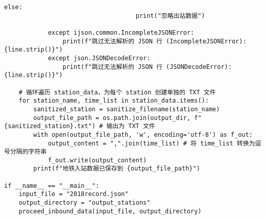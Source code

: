 \begin{lstlisting}[caption={处理和清洗入站数据}]
                                else:
                                    print("忽略出站数据")

            except ijson.common.IncompleteJSONError:
                print(f"跳过无法解析的 JSON 行 (IncompleteJSONError): {line.strip()}")
            except json.JSONDecodeError:
                print(f"跳过无法解析的 JSON 行 (JSONDecodeError): {line.strip()}")

    # 循环遍历 station_data，为每个 station 创建单独的 TXT 文件
    for station_name, time_list in station_data.items():
        sanitized_station = sanitize_filename(station_name)
        output_file_path = os.path.join(output_dir, f"{sanitized_station}.txt") # 输出为 TXT 文件
        with open(output_file_path, 'w', encoding='utf-8') as f_out:
            output_content = ",".join(time_list) # 将 time_list 转换为逗号分隔的字符串
            f_out.write(output_content)
        print(f"地铁入站数据已保存到 {output_file_path}")

if __name__ == "__main__":
    input_file = "2018record.json"
    output_directory = "output_stations"
    proceed_inbound_data(input_file, output_directory)    
\end{lstlisting}

